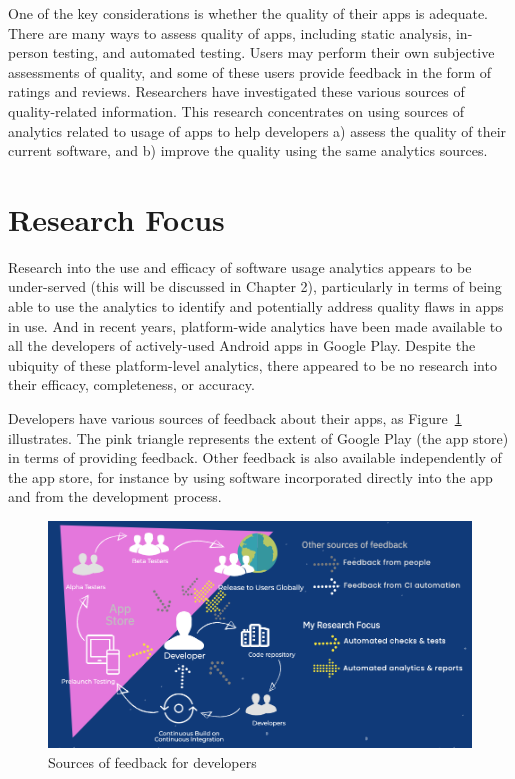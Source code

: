 One of the key considerations is whether the quality of their apps is adequate. There are many ways to assess quality of apps, including static analysis, in-person testing, and automated testing. Users may perform their own subjective assessments of quality, and some of these users provide feedback in the form of ratings and reviews. Researchers have investigated these various sources of quality-related information. This research concentrates on using sources of analytics related to usage of apps to help developers a) assess the quality of their current software, and b) improve the quality using the same analytics sources.



\section{Research Focus}
Research into the use and efficacy of software usage analytics appears to be under-served (this will be discussed in Chapter 2), particularly in terms of being able to use the analytics to identify and potentially address quality flaws in apps in use. And in recent years, platform-wide analytics have been made available to all the developers of actively-used Android apps in Google Play. Despite the ubiquity of these platform-level analytics, there appeared to be no research into their efficacy, completeness, or accuracy.

Developers have various sources of feedback about their apps, as Figure~\ref{fig:sources-of-feedback-for-developers} illustrates. The pink triangle represents the extent of Google Play (the app store) in terms of providing feedback. Other feedback is also available independently of the app store, for instance by using software incorporated directly into the app and from the development process.

\begin{figure}[htbp!]
    \centering
    \includegraphics[width=14cm]{images/silvias-developer-centric-figure-mobilesoft2020.png}
    \caption[Sources of feedback for developers]{Sources of feedback for developers \\}
    \label{fig:sources-of-feedback-for-developers}
\end{figure}

